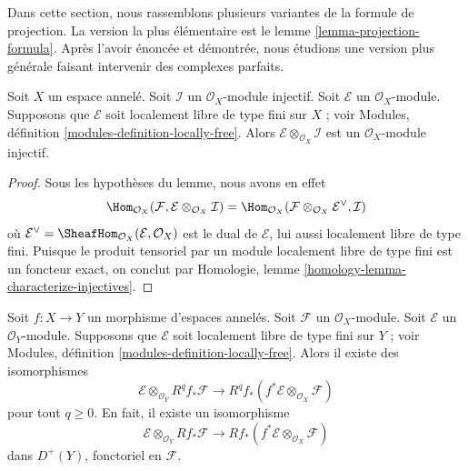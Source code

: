 \label{section-projection-formula}

\noindent
Dans cette section, nous rassemblons plusieurs variantes de la formule de projection. La version la plus élémentaire est le lemme \ref{lemma-projection-formula}. Après l'avoir énoncée et démontrée, nous étudions une version plus générale faisant intervenir des complexes parfaits.

\begin{lemma}

\label{lemma-injective-tensor-finite-locally-free}
Soit $X$ un espace annelé. Soit $\mathcal{I}$ un $\mathcal{O}_X$-module injectif. Soit $\mathcal{E}$ un $\mathcal{O}_X$-module. Supposons que $\mathcal{E}$ soit localement libre de type fini sur $X$ ; voir Modules, définition \ref{modules-definition-locally-free}. Alors $\mathcal{E} \otimes_{\mathcal{O}_X} \mathcal{I}$ est un $\mathcal{O}_X$-module injectif.
\end{lemma}

\begin{proof}
Sous les hypothèses du lemme, nous avons en effet $$
\Hom_{\mathcal{O}_X}(\mathcal{F},
\mathcal{E} \otimes_{\mathcal{O}_X} \mathcal{I})
=
\Hom_{\mathcal{O}_X}(
\mathcal{F} \otimes_{\mathcal{O}_X} \mathcal{E}^\vee, \mathcal{I})
$$ où $\mathcal{E}^\vee = \SheafHom_{\mathcal{O}_X}(\mathcal{E}, \mathcal{O}_X)$ est le dual de $\mathcal{E}$, lui aussi localement libre de type fini. Puisque le produit tensoriel par un module localement libre de type fini est un foncteur exact, on conclut par Homologie, lemme \ref{homology-lemma-characterize-injectives}.
\end{proof}

\begin{lemma}

\label{lemma-projection-formula}
Soit $f : X \to Y$ un morphisme d'espaces annelés. Soit $\mathcal{F}$ un $\mathcal{O}_X$-module. Soit $\mathcal{E}$ un $\mathcal{O}_Y$-module. Supposons que $\mathcal{E}$ soit localement libre de type fini sur $Y$ ; voir Modules, définition \ref{modules-definition-locally-free}. Alors il existe des isomorphismes $$
\mathcal{E} \otimes_{\mathcal{O}_Y} R^qf_*\mathcal{F}
\longrightarrow
R^qf_*(f^*\mathcal{E} \otimes_{\mathcal{O}_X} \mathcal{F})
$$ pour tout $q \geq 0$. En fait, il existe un isomorphisme $$
\mathcal{E} \otimes_{\mathcal{O}_Y} Rf_*\mathcal{F}
\longrightarrow
Rf_*(f^*\mathcal{E} \otimes_{\mathcal{O}_X} \mathcal{F})
$$ dans $D^{+}(Y)$, fonctoriel en $\mathcal{F}$.
\end{lemma}

